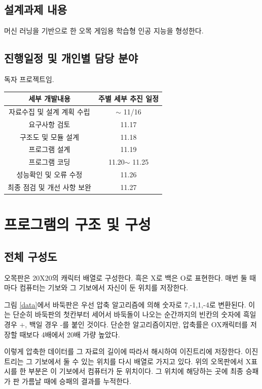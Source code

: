 \documentclass[12pt,a4paper]{report}
\begin{document}
\section{설계과제 내용}
머신 러닝을 기반으로 한 오목 게임용 학습형 인공 지능을 형성한다.

\section{진행일정 및 개인별 담당 분야}
독자 프로젝트임.

\begin{tabular}{|c|c|}
	\hline
	세부 개발내용&주별 세부 추진 일정\\
	\hline
	자료수집 및 설계 계획 수립&$\sim$ 11/16\\
	요구사항 검토&11.17\\
	구조도 및 모듈 설계&11.18\\
	프로그램 설계&11.19\\
	프로그램 코딩&11.20$\sim$ 11.25\\
	성능확인 및 오류 수정&11.26\\
	최종 점검 및 개선 사항 보완&11.27\\
	\hline
\end{tabular}
\chapter{프로그램의 구조 및 구성}

\section{전체 구성도}
오목판은 20X20의 캐릭터 배열로 구성한다.
흑은 X로 백은 O로 표현한다.
매번 둘 때마다 컴퓨터는 기보와 그 기보에서 자신이 둔 위치를 저장한다.

그림 \ref{data}에서 바둑판은 우선 압축 알고리즘에 의해 숫자로 7,-1,1,-4로 변환된다.
이는 단순히 바둑판의 첫칸부터 세어서 바둑돌이 나오는 순간까지의 빈칸의 숫자에 흑일 경우 +, 백일 경우 -를 붙인 것이다.
단순한 알고리즘이지만, 압축률은 OX캐릭터를 저장할 때보다 4배에서 20배 가량 높았다.

이렇게 압축한 데이터를 그 자료의 길이에 따라서 해시하여 이진트리에 저장한다.
이진트리는 그 기보에서 둘 수 있는 위치를 다시 배열로 가지고 있다.
위의 오목판에서 X표시를 한 부분은 이 기보에서 컴퓨터가 둔 위치이다. 
그 위치에 해당하는 곳에 최종 승패가 판 가름날 때에 승패의 결과를 누적한다.
\end{document}
